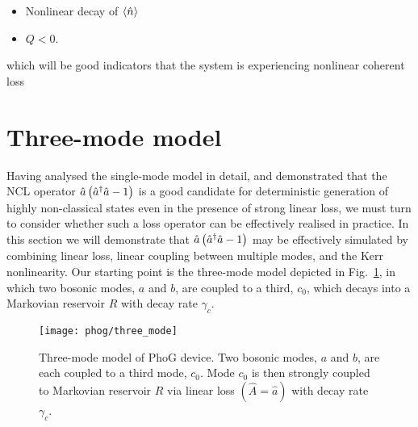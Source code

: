 \begin{itemize}
\item Nonlinear decay of $\ev{\hat{n}}$
\item $Q < 0$.
\end{itemize}

\noindent which will be good indicators that the system is experiencing nonlinear coherent loss





\section{Three-mode model}
Having analysed the single-mode model in detail, and demonstrated that the NCL operator $\hat{a}\left(\hat{a}^\dagger \hat{a} - 1\right)$ is a good candidate for deterministic generation of highly non-classical states even in the presence of strong linear loss, we must turn to consider whether such a loss operator can be effectively realised in practice. In this section we will demonstrate that $\hat{a}\left(\hat{a}^\dagger \hat{a} - 1\right)$ may be effectively simulated by combining linear loss, linear coupling between multiple modes, and the Kerr nonlinearity. Our starting point is the three-mode model depicted in Fig.~\ref{fig:phog_three_mode}, in which two bosonic modes, $a$ and $b$, are coupled to a third, $c_0$, which decays into a Markovian reservoir $R$ with decay rate $\gamma_c$. 

\begin{figure}[htp]
\centering
\texttt{[image: phog/three\_mode]}
\caption{\label{fig:phog_three_mode} Three-mode model of PhoG device. Two bosonic modes, $a$ and $b$, are each coupled to a third mode, $c_0$. Mode $c_0$ is then strongly coupled to Markovian reservoir $R$ via linear loss $\left(\hat{A} = \hat{a}\right)$ with decay rate $\gamma_c$. }
\end{figure}

